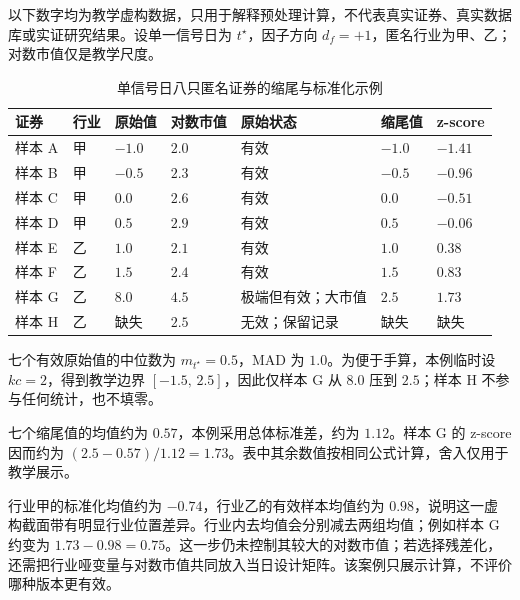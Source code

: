 以下数字均为教学虚构数据，只用于解释预处理计算，不代表真实证券、真实数据库或实证研究结果。设单一信号日为 \(t^\star\)，因子方向
\(d_f=+1\)，匿名行业为甲、乙；对数市值仅是教学尺度。

\begin{table}[htbp]
  \centering
  \footnotesize
  \caption{单信号日八只匿名证券的缩尾与标准化示例}
  \label{tab:ch05-toy-cross-section}
  \begin{tabularx}{\textwidth}{p{1.25cm} p{1.25cm} p{1.55cm} p{1.8cm} p{2.4cm} p{1.75cm} Y}
    \toprule
    证券 & 行业 & 原始值 & 对数市值 & 原始状态 & 缩尾值 & z-score \\
    \midrule
    样本 A & 甲 & \(-1.0\) & \(2.0\) & 有效 & \(-1.0\) & \(-1.41\) \\
    样本 B & 甲 & \(-0.5\) & \(2.3\) & 有效 & \(-0.5\) & \(-0.96\) \\
    样本 C & 甲 & \(0.0\) & \(2.6\) & 有效 & \(0.0\) & \(-0.51\) \\
    样本 D & 甲 & \(0.5\) & \(2.9\) & 有效 & \(0.5\) & \(-0.06\) \\
    样本 E & 乙 & \(1.0\) & \(2.1\) & 有效 & \(1.0\) & \(0.38\) \\
    样本 F & 乙 & \(1.5\) & \(2.4\) & 有效 & \(1.5\) & \(0.83\) \\
    样本 G & 乙 & \(8.0\) & \(4.5\) & 极端但有效；大市值 & \(2.5\) & \(1.73\) \\
    样本 H & 乙 & 缺失 & \(2.5\) & 无效；保留记录 & 缺失 & 缺失 \\
    \bottomrule
  \end{tabularx}
\end{table}

\begin{casebox}
七个有效原始值的中位数为 \(m_{t^\star}=0.5\)，MAD 为
\(1.0\)。为便于手算，本例临时设 \(kc=2\)，得到教学边界
\([-1.5,\,2.5]\)，因此仅样本 G 从 \(8.0\) 压到 \(2.5\)；样本 H 不参与任何统计，也不填零。

七个缩尾值的均值约为 \(0.57\)，本例采用总体标准差，约为
\(1.12\)。样本 G 的 z-score 因而约为
\((2.5-0.57)/1.12=1.73\)。表中其余数值按相同公式计算，舍入仅用于教学展示。
\end{casebox}

行业甲的标准化均值约为 \(-0.74\)，行业乙的有效样本均值约为
\(0.98\)，说明这一虚构截面带有明显行业位置差异。行业内去均值会分别减去两组均值；例如样本 G 约变为
\(1.73-0.98=0.75\)。这一步仍未控制其较大的对数市值；若选择残差化，还需把行业哑变量与对数市值共同放入当日设计矩阵。该案例只展示计算，不评价哪种版本更有效。


